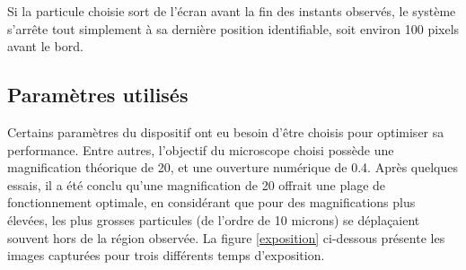 \documentclass[11pt,letterpaper]{article}
\begin{document}
Si la particule choisie sort de l'écran avant la fin des instants observés, le système s'arrête tout simplement à 
sa dernière position identifiable, soit environ 100 pixels avant le bord.

\subsection{Paramètres utilisés \label{para}}
Certains paramètres du dispositif ont eu besoin d'être choisis pour optimiser sa performance. Entre autres,
l'objectif du microscope choisi possède une magnification théorique de 20, et une ouverture numérique de 0.4. Après quelques essais, 
il a été conclu qu'une magnification de 20 offrait une plage de fonctionnement optimale, en considérant 
que pour des magnifications plus élevées, les plus grosses particules (de l'ordre de 10 microns) se déplaçaient souvent hors de la région observée. 
La figure \ref{exposition} ci-dessous présente les images
capturées pour trois différents temps d'exposition.
\end{document}
